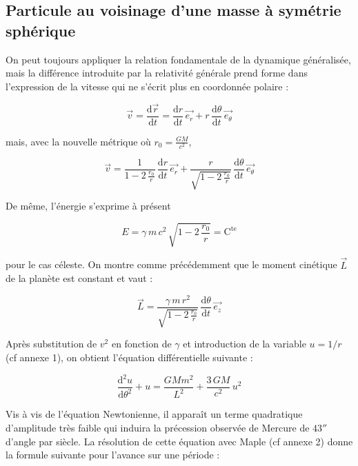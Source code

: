 \documentclass[12pt,a4paper]{article}
\newcommand{\dd}{\text{d}}
\newcommand{\ddt}[1]{\frac{\dd #1}{\dd t}}
\newcommand{\cte}{\text{C}^{\text{te}}}
\begin{document}
\subsection{Particule au voisinage d'une masse à symétrie sphérique}

On peut toujours appliquer la relation fondamentale de la dynamique
généralisée, mais la différence introduite par la relativité
générale prend forme dans l'expression de la vitesse qui ne s'écrit
plus en coordonnée polaire :

\begin{equation}
    \vec{v} = \ddt{\vec{r}} = \ddt{r}\, \vec{e_r}
            + r\,\ddt{\theta}\, \vec{e_{\theta}}
\end{equation}

\noindent mais, avec la nouvelle métrique où $r_0 = \frac{G M}{c^2}$,

\begin{equation}
    \vec{v} = \frac{1}{1-2\, \frac{r_0}{r}}\, \ddt{r}\, \vec{e_r}
    + \frac{r}{\sqrt{1-2\, \frac{r_0}{r}}} \, \ddt{\theta}\, \vec{e_{\theta}}
\end{equation}

\noindent   De même, l'énergie s'exprime à présent 
 
\begin{equation}
    E = \gamma\, m\, c^2\, \sqrt{1-2\, \frac{r_0}{r}} = \cte 
\end{equation}


\noindent pour le cas céleste. On montre comme précédemment que le moment cinétique $\vec{L}$ de la planète est constant et vaut :

\begin{equation}
    \vec{L} = \frac{\gamma\, m\, r^2}{\sqrt{1 - 2\,\frac{r_0}{r}}}\,
            \ddt{\theta}\, \vec{e_z}
\end{equation}

Après substitution de $v^2$ en fonction de $\gamma$ et introduction de
la variable $u = 1/r$ (cf annexe 1), on obtient l'équation
différentielle suivante :
            
\begin{equation}
    \boxed{
    \frac{\dd^2 u}{\dd \theta^2} + u 
    = \frac{G M m^2}{L^2} + \frac{3\, G M}{c^2}\, u^2
    }
\end{equation}

Vis à vis de l'équation Newtonienne, il apparaît un terme
quadratique d'amplitude très faible qui induira la précession
observée de Mercure de $43''$ d'angle par siècle. La résolution de
cette équation avec Maple (cf annexe 2) donne la formule suivante pour
l'avance sur une période :
\end{document}
